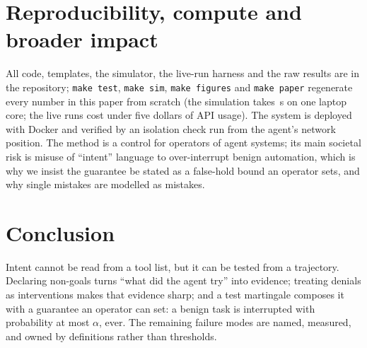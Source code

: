 \documentclass[11pt]{article}
\theoremstyle{definition}
\theoremstyle{remark}
\begin{document}
\section{Reproducibility, compute and broader impact}
All code, templates, the simulator, the live-run harness and the raw results are in the repository; \texttt{make test}, \texttt{make sim}, \texttt{make figures} and \texttt{make paper} regenerate every number in this paper from scratch (the simulation takes \simSeconds{}\,s on one laptop core; the live runs cost under five dollars of API usage). The system is deployed with Docker and verified by an isolation check run from the agent's network position. The method is a control for operators of agent systems; its main societal risk is misuse of ``intent'' language to over-interrupt benign automation, which is why we insist the guarantee be stated as a false-hold bound an operator sets, and why single mistakes are modelled as mistakes.

\section{Conclusion}
Intent cannot be read from a tool list, but it can be tested from a trajectory. Declaring non-goals turns ``what did the agent try'' into evidence; treating denials as interventions makes that evidence sharp; and a test martingale composes it with a guarantee an operator can set: a benign task is interrupted with probability at most $\alpha$, ever. The remaining failure modes are named, measured, and owned by definitions rather than thresholds.
\end{document}
